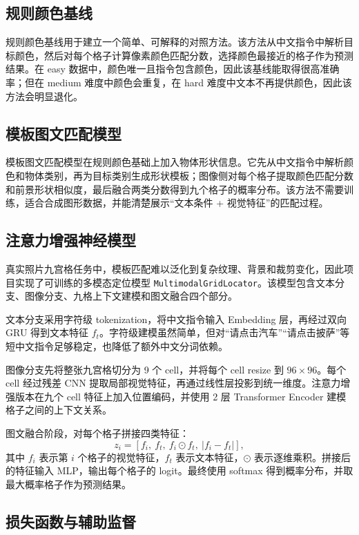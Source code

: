 \documentclass[UTF8,a4paper,12pt,fontset=fandol]{ctexart}
\newcommand{\code}[1]{\texttt{#1}}
\begin{document}
\subsection{规则颜色基线}

规则颜色基线用于建立一个简单、可解释的对照方法。该方法从中文指令中解析目标颜色，然后对每个格子计算像素颜色匹配分数，选择颜色最接近的格子作为预测结果。在 easy 数据中，颜色唯一且指令包含颜色，因此该基线能取得很高准确率；但在 medium 难度中颜色会重复，在 hard 难度中文本不再提供颜色，因此该方法会明显退化。

\subsection{模板图文匹配模型}

模板图文匹配模型在规则颜色基础上加入物体形状信息。它先从中文指令中解析颜色和物体类别，再为目标类别生成形状模板；图像侧对每个格子提取颜色匹配分数和前景形状相似度，最后融合两类分数得到九个格子的概率分布。该方法不需要训练，适合合成图形数据，并能清楚展示“文本条件 + 视觉特征”的匹配过程。

\subsection{注意力增强神经模型}

真实照片九宫格任务中，模板匹配难以泛化到复杂纹理、背景和裁剪变化，因此项目实现了可训练的多模态定位模型 \code{MultimodalGridLocator}。该模型包含文本分支、图像分支、九格上下文建模和图文融合四个部分。

文本分支采用字符级 tokenization，将中文指令输入 Embedding 层，再经过双向 GRU 得到文本特征 $f_t$。字符级建模虽然简单，但对“请点击汽车”“请点击披萨”等短中文指令足够稳定，也降低了额外中文分词依赖。

图像分支先将整张九宫格切分为 9 个 cell，并将每个 cell resize 到 $96\times96$。每个 cell 经过残差 CNN 提取局部视觉特征，再通过线性层投影到统一维度。注意力增强版本在九个 cell 特征上加入位置编码，并使用 2 层 Transformer Encoder 建模格子之间的上下文关系。

图文融合阶段，对每个格子拼接四类特征：
\[
  z_i = [f_i,\ f_t,\ f_i \odot f_t,\ |f_i-f_t|],
\]
其中 $f_i$ 表示第 $i$ 个格子的视觉特征，$f_t$ 表示文本特征，$\odot$ 表示逐维乘积。拼接后的特征输入 MLP，输出每个格子的 logit。最终使用 softmax 得到概率分布，并取最大概率格子作为预测结果。

\subsection{损失函数与辅助监督}
\end{document}

